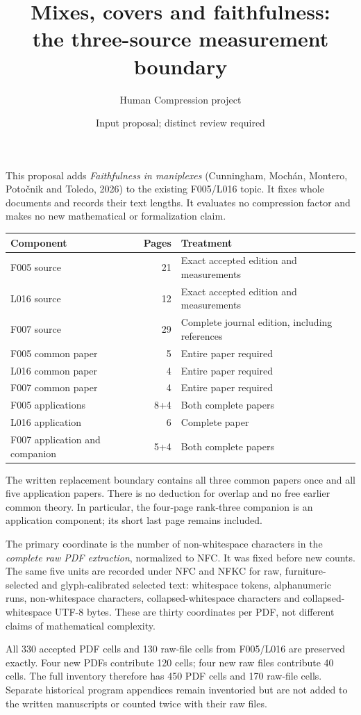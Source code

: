 \documentclass[a4paper,11pt]{article}
\title{Mixes, covers and faithfulness:\\the three-source measurement boundary}
\author{Human Compression project}\date{Input proposal; distinct review required}
\begin{document}
\maketitle
This proposal adds \emph{Faithfulness in maniplexes} (Cunningham, Mochán,
Montero, Potočnik and Toledo, 2026) to the existing F005/L016 topic.
It fixes whole documents and records their text lengths. It evaluates no
compression factor and makes no new mathematical or formalization claim.

\begin{center}\begin{tabular}{lrl}
\toprule
Component & Pages & Treatment\\\midrule
F005 source &21& Exact accepted edition and measurements\\
L016 source &12& Exact accepted edition and measurements\\
F007 source &29& Complete journal edition, including references\\
F005 common paper &5& Entire paper required\\
L016 common paper &4& Entire paper required\\
F007 common paper &4& Entire paper required\\
F005 applications &8+4& Both complete papers\\
L016 application &6& Complete paper\\
F007 application and companion &5+4& Both complete papers\\\bottomrule
\end{tabular}\end{center}
The written replacement boundary contains all three common papers once
and all five application papers. There is no deduction for overlap and no
free earlier common theory. In particular, the four-page rank-three
companion is an application component; its short last page remains included.

The primary coordinate is the number of non-whitespace characters in the
\emph{complete raw PDF extraction}, normalized to NFC. It was fixed before
new counts. The same five units are recorded under NFC and NFKC for raw,
furniture-selected and glyph-calibrated selected text: whitespace tokens,
alphanumeric runs, non-whitespace characters, collapsed-whitespace
characters and collapsed-whitespace UTF-8 bytes. These are thirty coordinates
per PDF, not different claims of mathematical complexity.

All 330 accepted PDF cells and 130 raw-file cells from F005/L016 are preserved
exactly. Four new PDFs contribute 120 cells; four new raw files contribute
40 cells. The full inventory therefore has 450 PDF cells and 170 raw-file
cells. Separate historical program appendices remain inventoried but are not
added to the written manuscripts or counted twice with their raw files.
\end{document}
